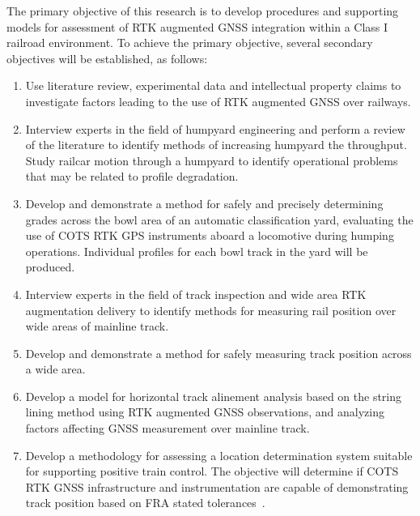The primary objective of this research is to develop procedures and
supporting models for assessment of RTK augmented GNSS integration within a Class I railroad environment. To achieve the primary objective, several secondary objectives
will be established, as follows:
\begin{enumerate}[1)]
\firmlist
\item Use literature review, experimental data and intellectual property claims to
investigate factors leading to the use of RTK augmented GNSS over railways.
\item Interview experts in the field of humpyard engineering and perform a review of the literature to identify methods of increasing humpyard the throughput. Study railcar motion through a humpyard to identify operational problems that may be related to profile degradation.
\item Develop and demonstrate a method for safely and precisely determining grades across the bowl area of an automatic classification yard, evaluating the use of COTS RTK GPS instruments aboard a locomotive during humping operations. Individual profiles for each bowl track in the yard will be produced.
\item Interview experts in the field of track inspection and wide area RTK augmentation delivery to identify methods for measuring rail position over wide areas of mainline track.
\item Develop and demonstrate a method for safely measuring track position across a wide area.
\item Develop a model for horizontal track alinement analysis based on the string lining method using RTK augmented GNSS observations, and analyzing factors affecting GNSS measurement over mainline track.
\item Develop a methodology for assessing a location determination system suitable for supporting positive train control. The objective will determine if COTS RTK GNSS infrastructure and instrumentation are capable of demonstrating track position based on FRA stated tolerances~\cite[4-5]{1995FRADiffe}.
\end{enumerate}

